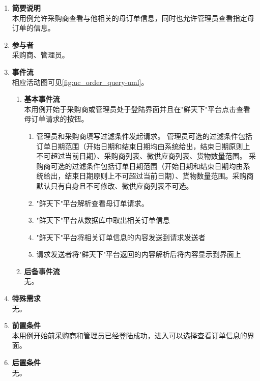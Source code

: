 \begin{enumerate}
    \item \textbf{简要说明}  \\ 本用例允许采购商查看与他相关的母订单信息，同时也允许管理员查看指定母订单的信息。
    \item \textbf{参与者} \\ 采购商、管理员。
    \item \textbf{事件流} \\ 相应活动图可见\autoref{fig:uc_order_query-uml}。
    \begin{enumerate} 
        \item \textbf{基本事件流} \\ 本用例开始于采购商或管理员处于登陆界面并且在"鲜天下"平台点击查看母订单请求的按钮。
        \begin{enumerate}
            \item 管理员和采购商填写过滤条件发起请求。
            管理员可选的过滤条件包括订单日期范围（开始日期和结束日期均由系统给出，结束日期原则上不可超过当前日期）、采购商列表、微供应商列表、货物数量范围。
            采购商可选的过滤条件包括订单日期范围（开始日期和结束日期均由系统给出，结束日期原则上不可超过当前日期）、货物数量范围。采购商默认只有自身且不可修改、微供应商列表不可选。

            \item "鲜天下"平台解析查看母订单请求。

            \item "鲜天下"平台从数据库中取出相关订单信息

            \item "鲜天下"平台将相关订单信息的内容发送到请求发送者
            
            \item 请求发送者将"鲜天下"平台返回的内容解析后将内容显示到界面上

        \end{enumerate}
        \item \textbf{后备事件流}  \\ 无。
        
    \end{enumerate}
    \item \textbf{特殊需求} \\ 无。
    \item \textbf{前置条件} \\ 本用例开始前采购商和管理员已经登陆成功，进入可以选择查看订单信息的界面。
    \item \textbf{后置条件} \\ 无。
\end{enumerate}

